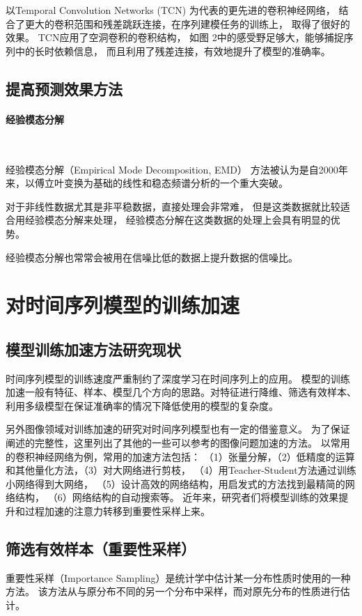     以Temporal Convolution Networks (TCN) 为代表的更先进的卷积神经网络，
    结合了更大的卷积范围和残差跳跃连接，在序列建模任务的训练上，
    取得了很好的效果\cite{bai2018empirical,pascanu2013construct}。
    TCN应用了空洞卷积的卷积结构，
    如图 2中的感受野足够大，能够捕捉序列中的长时依赖信息，
    而且利用了残差连接，有效地提升了模型的准确率。
  
\subsection{提高预测效果方法}
  \paragraph{经验模态分解}~{}

    经验模态分解（Empirical Mode Decomposition, EMD）\cite{rilling2003empirical}
    方法被认为是自2000年来，以傅立叶变换为基础的线性和稳态频谱分析的一个重大突破。
    
    对于非线性数据尤其是非平稳数据，直接处理会非常难，
    但是这类数据就比较适合用经验模态分解来处理，
    经验模态分解在这类数据的处理上会具有明显的优势。
    
    经验模态分解也常常会被用在信噪比低的数据上提升数据的信噪比。
\section{对时间序列模型的训练加速}
  \subsection{模型训练加速方法研究现状}
  时间序列模型的训练速度严重制约了深度学习在时间序列上的应用。
  模型的训练加速一般有特征、样本、模型几个方向的思路。对特征进行降维、筛选有效样本、
  利用多级模型在保证准确率的情况下降低使用的模型的复杂度。

  另外图像领域对训练加速的研究对时间序列模型也有一定的借鉴意义。
  为了保证阐述的完整性，这里列出了其他的一些可以参考的图像问题加速的方法。
  以常用的卷积神经网络为例，常用的加速方法包括：
  （1）张量分解，（2）低精度的运算和其他量化方法，（3）对大网络进行剪枝，
  （4）用Teacher-Student方法通过训练小网络得到大网络，
  （5）设计高效的网络结构，用启发式的方法找到最精简的网络结构，
  （6）网络结构的自动搜索等\cite{lebedev2018speeding}。
  近年来，研究者们将模型训练的效果提升和过程加速的注意力转移到重要性采样上来。

  \subsection{筛选有效样本（重要性采样）}
  重要性采样（Importance Sampling）是统计学中估计某一分布性质时使用的一种方法。
  该方法从与原分布不同的另一个分布中采样，而对原先分布的性质进行估计。

